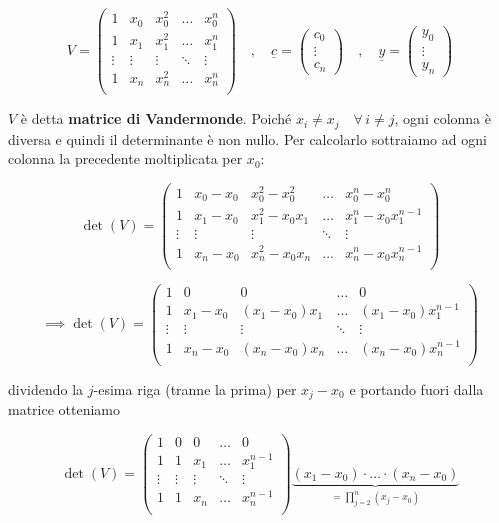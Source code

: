 $$V=
\begin{pmatrix}
   1 & x_0 & x_0^2 & \ldots & x_0^n\\
   1 & x_1 & x_1^2 & \ldots & x_1^n\\
   \vdots & \vdots & \vdots & \ddots & \vdots\\
   1 & x_n & x_n^2 & \ldots & x_n^n\\
\end{pmatrix}
\quad,\quad
\underline{c}=
\begin{pmatrix}
   c_0\\
   \vdots\\
   c_n
\end{pmatrix}
\quad,\quad
\underline{y}=
\begin{pmatrix}
   y_0\\
   \vdots\\
   y_n
\end{pmatrix}$$

$V$ è detta \textbf{matrice di Vandermonde}. Poiché $x_i \neq x_j \quad \forall \, i \neq j$, ogni colonna è diversa e quindi il determinante è non nullo. Per calcolarlo sottraiamo ad ogni colonna la precedente moltiplicata per $x_0$:

$$\det (V)=
\begin{pmatrix}
   1 & x_0 - x_0 & x_0^2 - x_0^2 & \ldots & x_0^n - x_0^n\\
   1 & x_1 - x_0 & x_1^2 - x_0x_1 & \ldots & x_1^n - x_0x_1^{n-1}\\
   \vdots & \vdots & \vdots & \ddots & \vdots\\
   1 & x_n - x_0 & x_n^2 - x_0x_n & \ldots & x_n^n - x_0 x_n^{n-1}\\
\end{pmatrix}$$

$$\implies \det (V)=
\begin{pmatrix}
   1 & 0 & 0 & \ldots & 0\\
   1 & x_1 - x_0 & (x_1 - x_0)x_1 & \ldots & (x_1 - x_0)x_1^{n-1}\\
   \vdots & \vdots & \vdots & \ddots & \vdots\\
   1 & x_n - x_0 & (x_n - x_0)x_n & \ldots & (x_n - x_0)x_n^{n-1}\\
\end{pmatrix}$$

dividendo la $j$-esima riga (tranne la prima) per $x_j - x_0$ e portando fuori dalla matrice otteniamo

$$\det (V)=
\begin{pmatrix}
   1 & 0 & 0 & \ldots & 0\\
   1 & 1 & x_1 & \ldots & x_1^{n-1}\\
   \vdots & \vdots & \vdots & \ddots & \vdots\\
   1 & 1 & x_n & \ldots & x_n^{n-1}\\
\end{pmatrix}
\underbrace{(x_1 - x_0) \cdot \ldots \cdot (x_n - x_0)}_{\displaystyle = \prod_{j=2}^{n} (x_j - x_0)}$$

